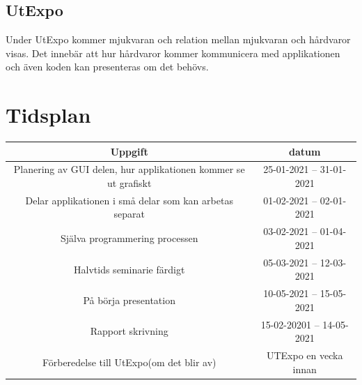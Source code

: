 \documentclass{article}
\begin{document}
\subsection{UtExpo}
Under UtExpo kommer mjukvaran och relation mellan mjukvaran och hårdvaror visas. Det innebär att hur hårdvaror kommer kommunicera med applikationen och även koden kan presenteras om det behövs.\newline
\newpage
\section{Tidsplan} 
\begin{table}[h!]

    \begin{tabular}{|c|c|}
        \hline
        \textbf {Uppgift} & \textbf{datum}  \\
        \hline
        Planering av GUI delen, hur applikationen kommer se ut grafiskt & 25-01-2021 -- 31-01-2021 \\
        \hline
        Delar applikationen i små delar som kan arbetas separat & 01-02-2021 -- 02-01-2021\\
        \hline
        Själva programmering processen & 03-02-2021 -- 01-04-2021\\
        \hline
        Halvtids seminarie färdigt & 05-03-2021 -- 12-03-2021\\
        \hline
        På börja presentation  & 10-05-2021 -- 15-05-2021 \\
        \hline
        Rapport skrivning & 15-02-20201 -- 14-05-2021\\
        \hline
        Förberedelse till UtExpo(om det blir av) & UTExpo en vecka innan \\
        \hline
    \end{tabular}
\end{table}
\end{document}
